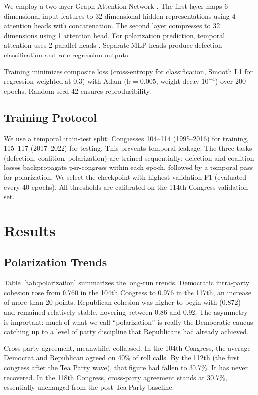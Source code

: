 \documentclass[11pt]{article}
\begin{document}
We employ a two-layer Graph Attention Network \citep{velickovic2018graph}. The first layer maps 6-dimensional input features to 32-dimensional hidden representations using 4 attention heads with concatenation. The second layer compresses to 32 dimensions using 1 attention head. For polarization prediction, temporal attention uses 2 parallel heads \citep{vaswani2017attention}. Separate MLP heads produce defection classification and rate regression outputs.

Training minimizes composite loss (cross-entropy for classification, Smooth L1 for regression weighted at 0.3) with Adam ($\text{lr} = 0.005$, weight decay $10^{-4}$) over 200 epochs. Random seed 42 ensures reproducibility.

\subsection{Training Protocol}

We use a temporal train-test split: Congresses 104--114 (1995--2016) for training, 115--117 (2017--2022) for testing. This prevents temporal leakage. The three tasks (defection, coalition, polarization) are trained sequentially: defection and coalition losses backpropagate per-congress within each epoch, followed by a temporal pass for polarization. We select the checkpoint with highest validation F1 (evaluated every 40 epochs). All thresholds are calibrated on the 114th Congress validation set.

\section{Results}

\subsection{Polarization Trends}

Table~\ref{tab:polarization} summarizes the long-run trends. Democratic intra-party cohesion rose from 0.760 in the 104th Congress to 0.976 in the 117th, an increase of more than 20 points. Republican cohesion was higher to begin with (0.872) and remained relatively stable, hovering between 0.86 and 0.92. The asymmetry is important: much of what we call ``polarization'' is really the Democratic caucus catching up to a level of party discipline that Republicans had already achieved.

Cross-party agreement, meanwhile, collapsed. In the 104th Congress, the average Democrat and Republican agreed on 40\% of roll calls. By the 112th (the first congress after the Tea Party wave), that figure had fallen to 30.7\%. It has never recovered. In the 118th Congress, cross-party agreement stands at 30.7\%, essentially unchanged from the post-Tea Party baseline.
\end{document}
